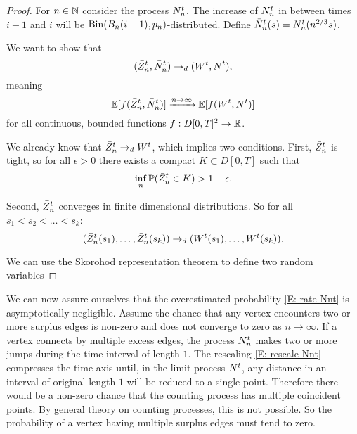 \begin{proof}

For $n \in \mathbb{N}$ consider the process $N_n^t$.
The increase of $N_n^t$ in between times $i-1$ and $i$ will be $\operatorname*{Bin}(B_n(i-1),p_n)$-distributed.
Define $\bar{N}_n^t(s) = N_n^t(n^{2 / 3}s)$.

We want to show that
\begin{equation}
(\bar{Z}^t_n, \bar{N}_n^t) \rightarrow_d (W^t, N^t),
\end{equation}
meaning 
\begin{equation}
\mathbb{E}[f(\bar{Z}^t_n, \bar{N}_n^t)] \xrightarrow{n \rightarrow \infty} \mathbb{E}[f(W^t, N^t)]
\end{equation}
for all continuous, bounded functions $f:D[0,T]^2\rightarrow\mathbb{R}$.

We already know that $\bar{Z}^t_n \rightarrow_d W^t$, which implies two conditions.
First, $\bar{Z}^t_n$ is tight, 
so for all $\epsilon>0$ there exists a compact $K \subset D[0,T]$ such that
\begin{equation}
\inf_n \mathbb{P} ( \bar{Z}^t_n \in K) > 1 - \epsilon.
\end{equation}

Second, $\bar{Z}^t_n$ converges in finite dimensional distributions.
So for all $s_1 < s_2 < \dots < s_k$:
\begin{equation}
(\bar{Z}^t_n(s_1), \dots, \bar{Z}^t_n(s_k)) \rightarrow_d (W^t(s_1), \dots, W^t(s_k)).
\end{equation}

We can use the Skorohod representation theorem to define two random variables




\end{proof}


We can now assure ourselves that the overestimated probability \eqref{E: rate Nnt} is asymptotically negligible.
Assume the chance that any vertex encounters two or more surplus edges is non-zero and does not converge to zero as $n \rightarrow \infty$.
If a vertex connects by multiple excess edges, the process $N_n^t$ makes two or more jumps during the time-interval of length $1$.
The rescaling \eqref{E: rescale Nnt} compresses the time axis until, in the limit process $N^t$, 
any distance in an interval of original length $1$ will be reduced to a single point.
Therefore there would be a non-zero chance that the counting process has multiple coincident points.
By general theory on counting processes, this is not possible.
So the probability of a vertex having multiple surplus edges must tend to zero.

















